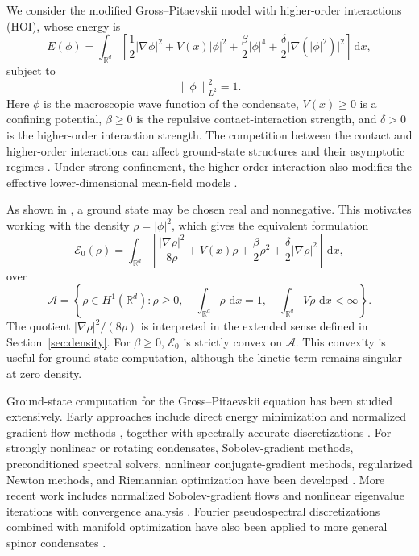 \documentclass[11pt]{article}
\newcommand{\R}{\mathbb{R}}
\newcommand{\A}{\mathcal{A}}
\newcommand{\E}{\mathcal{E}}
\newcommand{\dd}{\,\mathrm{d}}
\newcommand{\norm}[1]{\left\|#1\right\|}
\newcommand{\grad}{\nabla}
\newcommand{\half}{\frac12}
\theoremstyle{plain}
\theoremstyle{definition}
\numberwithin{equation}{section}
\begin{document}
We consider the modified Gross--Pitaevskii model with higher-order
interactions (HOI), whose energy is
\begin{equation}
\label{eq:wave-energy}
E(\phi)
=
\int_{\R^d}
\left[
\half |\grad\phi|^2
+V(x)|\phi|^2
+\frac{\beta}{2}|\phi|^4
+\frac{\delta}{2}\bigl|\grad(|\phi|^2)\bigr|^2
\right]\dd x,
\end{equation}
subject to
\begin{equation}
\label{eq:wave-mass}
\norm{\phi}_{L^2}^2=1.
\end{equation}
Here $\phi$ is the macroscopic wave function of the condensate,
$V(x)\ge0$ is a confining potential, $\beta\ge0$ is the repulsive
contact-interaction strength, and $\delta>0$ is the higher-order
interaction strength.
The competition between the contact and
higher-order interactions can affect ground-state structures and
their asymptotic regimes \cite{BaoCaiRuan2019,RuanCaiBao2016}. Under
strong confinement, the higher-order interaction also modifies the
effective lower-dimensional mean-field models
\cite{RuanCaiBao2016}.

As shown in \cite{BaoCaiRuan2019}, a ground state may be chosen real
and nonnegative. This motivates working with the density
$\rho=|\phi|^2$, which gives the equivalent formulation
\begin{equation}
\label{eq:density-energy}
\E_0(\rho)
=
\int_{\R^d}
\left[
\frac{|\grad\rho|^2}{8\rho}
+V(x)\rho
+\frac{\beta}{2}\rho^2
+\frac{\delta}{2}|\grad\rho|^2
\right]\dd x,
\end{equation}
over
\begin{equation}
\label{eq:admissible-density}
\A
=
\left\{
\rho\in H^1(\R^d):
\rho\ge0,\quad
\int_{\R^d}\rho\,\dd x=1,\quad
\int_{\R^d}V\rho\,\dd x<\infty
\right\}.
\end{equation}
The quotient $|\grad\rho|^2/(8\rho)$ is interpreted in the extended
sense defined in Section~\ref{sec:density}. For $\beta\ge0$,
$\E_0$ is strictly convex on $\A$. This convexity is useful for
ground-state computation, although the kinetic term remains singular
at zero density.


Ground-state computation for the Gross--Pitaevskii equation has been
studied extensively. Early approaches include direct energy
minimization and normalized gradient-flow methods
\cite{BaoDu2004,BaoTang2003}, together with spectrally accurate
discretizations \cite{BaoChernLim2006}. For strongly nonlinear or
rotating condensates, Sobolev-gradient methods, preconditioned
spectral solvers, nonlinear conjugate-gradient methods, regularized
Newton methods, and Riemannian optimization have been developed
\cite{AntoineDuboscq2014,AntoineLevittTang2017,
DanailaKazemi2010,DanailaProtas2017,WuWenBao2017}. More recent work
includes normalized Sobolev-gradient flows and nonlinear eigenvalue
iterations with convergence analysis
\cite{AltmannHenningPeterseim2021,ChenLuLuZhang2024,
HenningPeterseim2020}. Fourier pseudospectral discretizations combined
with manifold optimization have also been applied to more general
spinor condensates \cite{TianCaiWuWen2020}.
\end{document}
